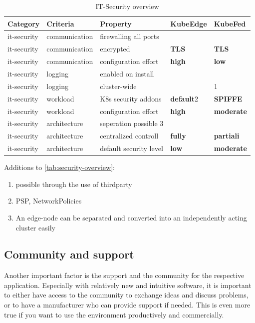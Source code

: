 \documentclass[MSC,Master,english]{twbook}%
\newcommand{\cmark}{\ding{51}}%
\newcommand{\xmark}{\ding{55}}%
\begin{document}
\begin{table}[ht]
    \begin{center}
        \begin{tabular}{|l|l|l|l|l|}
            \hline
            Category & Criteria & Property & \textbf{KubeEdge} & \textbf{KubeFed} \\
            \hline
            it-security & communication & firewalling all ports & \cmark & \xmark \\
            it-security & communication & encrypted & \textbf{TLS} & \textbf{TLS} \\
            it-security & communication & configuration effort & \textbf{high} & \textbf{low} \\
            it-security & logging & enabled on install & \xmark & \cmark \\
            it-security & logging & cluster-wide & \cmark & \xmark \tiny{1} \\
            it-security & workload & K8s security addons & \textbf{default}\tiny{2} & \textbf{SPIFFE} \cite{ke-secure-fw} \\
            it-security & workload & configuration effort & \textbf{high} & \textbf{moderate} \\
            it-security & architecture & seperation possible \tiny{3} & \xmark & \cmark \\
            it-security & architecture & centralized controll & \textbf{fully} & \textbf{partiali} \\
            it-security & architecture & default security level & \textbf{low} & \textbf{moderate} \\
            \hline
        \end{tabular}
        \caption{IT-Security overview}
        \label{tab:security-overview}
    \end{center}
\end{table}

Additions to \autoref{tab:security-overview}:
\begin{enumerate}
    \itemsep0em
    \item possible through the use of thirdparty
    \item \ac{PSP}, NetworkPolicies
    \item An edge-node can be separated and converted into an independently acting cluster easily
\end{enumerate}

\subsection{Community and support}
Another important factor is the support and the community for the respective application. Especially with relatively new and intuitive software, it is important to either have access to the community to exchange ideas and discuss problems, or to have a manufacturer who can provide support if needed. This is even more true if you want to use the environment productively and commercially.
\end{document}
